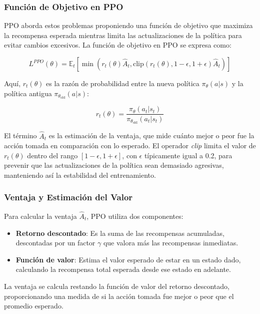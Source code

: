 \documentclass[a4paper,12pt, twoside]{report}
\begin{document}
\subsubsection{Función de Objetivo en PPO}

PPO aborda estos problemas proponiendo una función de objetivo que maximiza la recompensa 
esperada mientras limita las actualizaciones de la política para evitar cambios excesivos. 
La función de objetivo en PPO se expresa como:

\[
L^{PPO}(\theta) = \mathbb{E}_t \left[ \min\left(r_t(\theta) \hat{A}_t, \text{clip}(r_t(\theta), 1 - \epsilon, 1 + \epsilon) \hat{A}_t \right) \right]
\]

Aquí, \( r_t(\theta) \) es la razón de probabilidad entre la nueva política \(\pi_\theta(a|s)\) 
y la política antigua \(\pi_{\theta_{\text{old}}}(a|s)\):

\[
r_t(\theta) = \frac{\pi_\theta(a_t|s_t)}{\pi_{\theta_{\text{old}}}(a_t|s_t)}
\]

El término \(\hat{A}_t\) es la estimación de la ventaja, que mide cuánto mejor o peor fue la 
acción tomada en comparación con lo esperado. El operador \textit{clip} limita el valor de 
\(r_t(\theta)\) dentro del rango \([1 - \epsilon, 1 + \epsilon]\), con \(\epsilon\) típicamente 
igual a 0.2, para prevenir que las actualizaciones de la política sean demasiado agresivas,
manteniendo así la estabilidad del entrenamiento.

\subsubsection{Ventaja y Estimación del Valor}

Para calcular la ventaja \(\hat{A}_t\), PPO utiliza dos componentes:

\begin{itemize}
    \item \textbf{Retorno descontado}: Es la suma de las recompensas acumuladas, descontadas 
    por un factor \(\gamma\) que valora más las recompensas inmediatas.
    \item \textbf{Función de valor}: Estima el valor esperado de estar en un estado dado, 
    calculando la recompensa total esperada desde ese estado en adelante.
\end{itemize}

La ventaja se calcula restando la función de valor del retorno descontado, proporcionando 
una medida de si la acción tomada fue mejor o peor que el promedio esperado.
\end{document}
